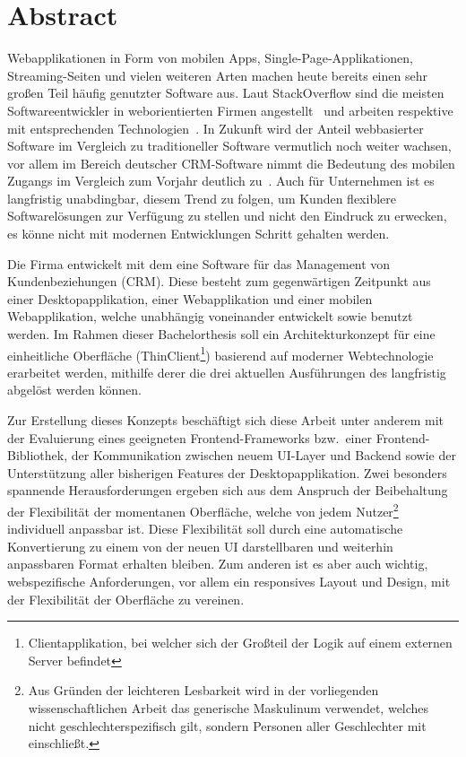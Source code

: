 \chapter{Abstract}

Webapplikationen in Form von mobilen Apps, Single-Page-Applikationen, Streaming-Seiten und vielen weiteren Arten machen heute bereits einen sehr großen Teil häufig genutzter Software aus. Laut StackOverflow sind die meisten Softwareentwickler in weborientierten Firmen angestellt~\parencite{stackoverflow_survey_company_2018} und arbeiten respektive mit entsprechenden Technologien~\parencite{stackoverflow_survey_technologies_2018}.
In Zukunft wird der Anteil webbasierter Software im Vergleich zu traditioneller Software vermutlich noch weiter wachsen, vor allem im Bereich deutscher CRM-Software nimmt die Bedeutung des mobilen Zugangs im Vergleich zum Vorjahr deutlich zu~\parencite[vgl.][]{bahr_capterra_2019}.
Auch für Unternehmen ist es langfristig unabdingbar, diesem Trend zu folgen, um Kunden flexiblere Softwarelösungen zur Verfügung zu stellen und nicht den Eindruck zu erwecken, es könne nicht mit modernen Entwicklungen Schritt gehalten werden.

Die Firma  entwickelt mit dem  eine Software für das Management von Kundenbeziehungen (\gls{CRM}). Diese besteht zum gegenwärtigen Zeitpunkt aus einer Desktopapplikation, einer Webapplikation und einer mobilen Webapplikation, welche unabhängig voneinander entwickelt sowie benutzt werden.
Im Rahmen dieser Bachelorthesis soll ein Architekturkonzept für eine einheitliche Oberfläche (ThinClient\footnote{Clientapplikation, bei welcher sich der Großteil der Logik auf einem externen Server befindet}) basierend auf moderner Webtechnologie erarbeitet werden, mithilfe derer die drei aktuellen Ausführungen des  langfristig abgelöst werden können.

Zur Erstellung dieses Konzepts beschäftigt sich diese Arbeit unter anderem mit der Evaluierung eines geeigneten Frontend-Frameworks bzw.\ einer Frontend-Bibliothek, der Kommunikation zwischen neuem UI-Layer und Backend sowie der Unterstützung aller bisherigen Features der Desktopapplikation.
Zwei besonders spannende Herausforderungen ergeben sich aus dem Anspruch der Beibehaltung der Flexibilität der momentanen Oberfläche, welche von jedem Nutzer\footnote{Aus Gründen der leichteren Lesbarkeit wird in der vorliegenden wissenschaftlichen Arbeit das generische Maskulinum verwendet, welches nicht geschlechterspezifisch gilt, sondern Personen aller Geschlechter mit einschließt.} individuell anpassbar ist. Diese Flexibilität soll durch eine automatische Konvertierung zu einem von der neuen UI darstellbaren und weiterhin anpassbaren Format erhalten bleiben. Zum anderen ist es aber auch wichtig, webspezifische Anforderungen, vor allem ein responsives Layout und Design, mit der Flexibilität der Oberfläche zu vereinen.
